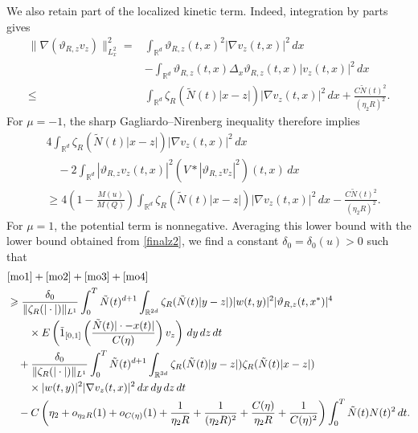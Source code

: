\documentclass[reqno,11pt]{amsart}
\theoremstyle{plain}
\theoremstyle{definition}
\numberwithin{equation}{section}
\numberwithin{theorem}{section}
\def\geq{\geqslant}
\def\leq{\leqslant}
\def\R{\mathbb{R}}
\begin{document}
We also retain part of the localized kinetic term. Indeed, integration by parts gives
\begin{align*}
 \|\nabla(\vartheta_{R,z}v_z)\|_{L_x^2}^2
 ={}&\int_{\R^d}\vartheta_{R,z}(t,x)^2|\nabla v_z(t,x)|^2\,dx\\
 &-\int_{\R^d}\vartheta_{R,z}(t,x)\Delta_x\vartheta_{R,z}(t,x)
                       |v_z(t,x)|^2\,dx\\
 \leq{}&\int_{\R^d}\zeta_R(\tilde N(t)|x-z|)|\nabla v_z(t,x)|^2\,dx
                +\frac{C\tilde N(t)^2}{(\eta_2R)^2}.
\end{align*}
For $\mu=-1$, the sharp Gagliardo--Nirenberg inequality therefore implies
\begin{align*}
 &4\int_{\R^d}\zeta_R(\tilde N(t)|x-z|)|\nabla v_z(t,x)|^2\,dx\\
 &\quad-2\int_{\R^d}|\vartheta_{R,z}v_z(t,x)|^2
                     (V*|\vartheta_{R,z}v_z|^2)(t,x)\,dx\\
 &\geq4\left(1-\frac{M(u)}{M(Q)}\right)
       \int_{\R^d}\zeta_R(\tilde N(t)|x-z|)|\nabla v_z(t,x)|^2\,dx
       -\frac{C\tilde N(t)^2}{(\eta_2R)^2}.
\end{align*}
For $\mu=1$, the potential term is nonnegative. Averaging this lower bound
with the lower bound obtained from \eqref{finalz2}, we find a constant
$\delta_0=\delta_0(u)>0$ such that
\begin{align}\label{mmmn2}
 &\eqref{mo1}+\eqref{mo2}+\eqref{mo3}+\eqref{mo4}\notag\\
 &\geq\frac{\delta_0}{\|\zeta_R(|\cdot|)\|_{L^1}}
       \int_0^T\tilde N(t)^{d+1}\int_{\R^{2d}}
       \zeta_R(\tilde N(t)|y-z|)|w(t,y)|^2
       |\vartheta_{R,z}(t,x^{\ast})|^4\notag\\
 &\qquad\times E\left(\tilde{1}_{[0,1]}
       \left(\frac{\tilde N(t)|\cdot-x(t)|}{C(\eta)}\right)v_z\right)
                 \,dy\,dz\,dt\notag\\
 &\quad+\frac{\delta_0}{\|\zeta_R(|\cdot|)\|_{L^1}}
       \int_0^T\tilde N(t)^{d+1}\int_{\R^{3d}}
       \zeta_R(\tilde N(t)|y-z|)\zeta_R(\tilde N(t)|x-z|)\notag\\
 &\qquad\times |w(t,y)|^2|\nabla v_z(t,x)|^2\,dx\,dy\,dz\,dt\notag\\
 &\quad-C\left(\eta_2+o_{\eta_2R}(1)+o_{C(\eta)}(1)
       +\frac1{\eta_2R}+\frac1{(\eta_2R)^2}
       +\frac{C(\eta)}{\eta_2R}+\frac1{C(\eta)^2}\right)
       \int_0^T\tilde N(t)N(t)^2\,dt.
\end{align}
\end{document}
